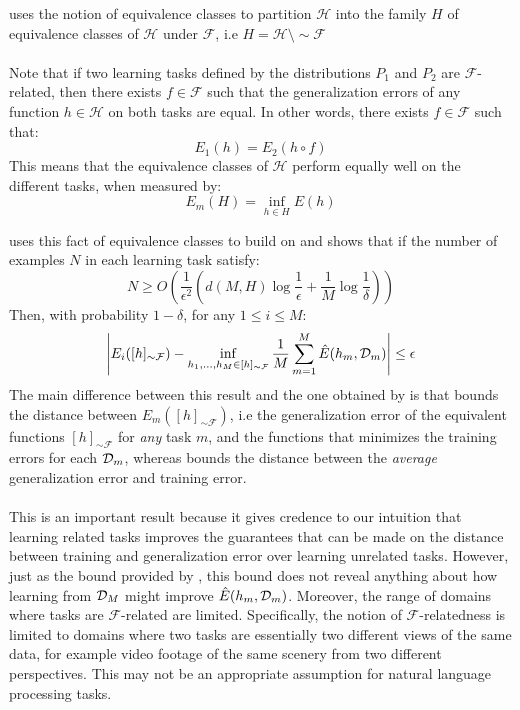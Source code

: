 \citet{ben2003} uses the notion of equivalence classes to partition $\mathcal{H}$ into the family $H$ of equivalence classes of $\mathcal{H}$ under $\mathcal{F}$, i.e $H = \mathcal{H} \setminus \sim \mathcal{F}$
\\\\
Note that if two learning tasks defined by the distributions $P_1$ and $P_2$ are $\mathcal{F}$-related, then there exists $f \in \mathcal{F}$ such that the generalization errors of any function $h \in \mathcal{H}$ on both tasks are equal. In other words, there exists $f \in \mathcal{F}$ such that:
$$
E_1(h) = E_2(h \circ f)
$$
This means that the equivalence classes of $\mathcal{H}$ perform equally well on the different tasks, when measured by:
$$
E_m(H) = \inf\limits_{h \in H}E(h)
$$

\citet{ben2003} uses this fact of equivalence classes to build on \citet{baxter2000} and shows that if the number of examples $N$ in each learning task satisfy:
$$
N \geq O\left(\frac{1}{\epsilon^2}\left(d(M, H) \log \frac{1}{\epsilon} + \frac{1}{M} \log \frac{1}{\delta}\right)\right)
$$
Then, with probability $1 - \delta$, for any $1 \leq i \leq M$:
$$
\left| E_i([h]_{\sim \mathcal{F}}) - \inf\limits_{h_1,\dots,h_M \in [h]_{\sim \mathcal{F}}} \frac{1}{M}\sum\limits_{m = 1}^M \hat{E}(h_m, \mathcal{D}_m)\right|  \leq \epsilon
$$
The main difference between this result and the one obtained by \citet{baxter2000} is that \citet{ben2003} bounds the distance between $E_m([h]_{\sim \mathcal{F}})$, i.e the generalization error of the equivalent functions $[h]_{\sim \mathcal{F}}$ for \emph{any} task $m$, and the functions that minimizes the training errors for each $\mathcal{D}_m$, whereas \citet{baxter2000} bounds the distance between the \emph{average} generalization error and training error.
\\\\
This is an important result because it gives credence to our intuition that learning related tasks improves the guarantees that can be made on the distance between training and generalization error over learning unrelated tasks. However, just as the bound provided by \citet{baxter2000}, this bound does not reveal anything about how learning from $\mathcal{D}_M$ might improve $\hat{E}(h_m, \mathcal{D}_m)$. Moreover, the range of domains where tasks are $\mathcal{F}$-related are limited. Specifically, the notion of $\mathcal{F}$-relatedness is limited to domains where two tasks are essentially two different views of the same data, for example video footage of the same scenery from two different perspectives. This may not be an appropriate assumption for natural language processing tasks.
